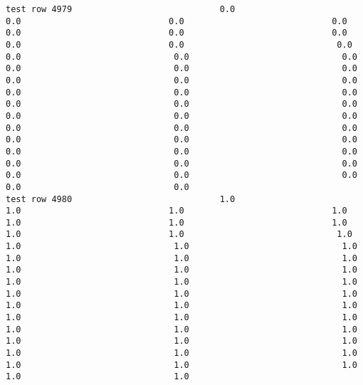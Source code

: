 \documentclass[11pt]{article}
\begin{document}
\begin{verbatim}
test row 4979                             0.0                             0.0                             0.0                             0.0                             0.0                             0.0                             0.0                             0.0                             0.0                              0.0                              0.0                              0.0                              0.0                              0.0                              0.0                              0.0                              0.0                              0.0                              0.0                              0.0                              0.0                              0.0                              0.0                              0.0                              0.0                              0.0                              0.0                              0.0                              0.0                              0.0                              0.0                              0.0                              0.0                              0.0                              0.0                              0.0                              0.0                              0.0                              0.0                              0.0                              0.0                              0.0                              0.0                              0.0                              0.0
test row 4980                             1.0                             1.0                             1.0                             1.0                             1.0                             1.0                             1.0                             1.0                             1.0                              1.0                              1.0                              1.0                              1.0                              1.0                              1.0                              1.0                              1.0                              1.0                              1.0                              1.0                              1.0                              1.0                              1.0                              1.0                              1.0                              1.0                              1.0                              1.0                              1.0                              1.0                              1.0                              1.0                              1.0                              1.0                              1.0                              1.0                              1.0                              1.0                              1.0                              1.0                              1.0                              1.0                              1.0                              1.0                              1.0

\end{verbatim}
\end{document}
